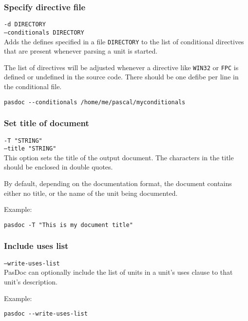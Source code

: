 \documentclass[11pt]{article}
\begin{document}
\subsubsection{Specify directive file}
\label{specifydirectives}

{\tt -d DIRECTORY}\\
{\tt --conditionals DIRECTORY}\\

Adds the defines specified in a file {\tt DIRECTORY} to the list of conditional directives 
that are present whenever parsing a unit is started.

The list of directives will be adjusted whenever a directive like {\tt WIN32}
or {\tt FPC} is defined or undefined in the source code. There should be one
defibe per line in the conditional file. 

\begin{verbatim}
pasdoc --conditionals /home/me/pascal/myconditionals
\end{verbatim}

\subsubsection{Set title of document}

{\tt -T "STRING"}\\
{\tt --title "STRING"}\\

This option sets the title of the output document. 
The characters in the title should be enclosed in double quotes. 

By default, depending on the documentation format, the document 
contains either no title, or the name of the unit being documented. 

Example:
\begin{verbatim}
pasdoc -T "This is my document title"
\end{verbatim}

\subsubsection{Include uses list}

{\tt --write-uses-list}\\

PasDoc can optionally include the list of units in a unit's uses 
clause to that unit's description. 

Example:
\begin{verbatim}
pasdoc --write-uses-list
\end{verbatim}
\end{document}
